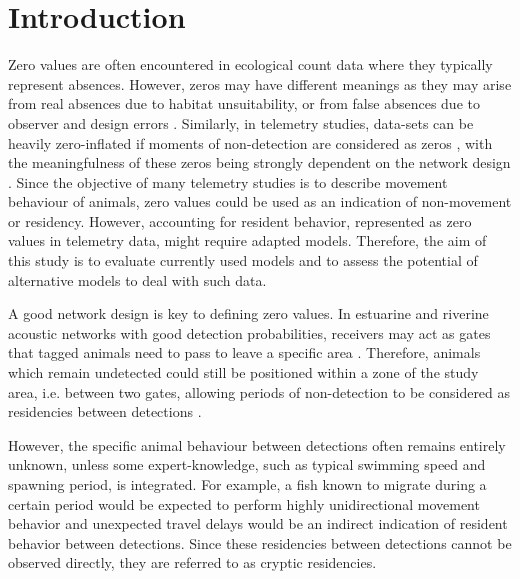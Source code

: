 \documentclass[preprint,12pt,authoryear]{elsarticle}
\begin{document}
\linenumbers

\section{Introduction}
\label{Introduction}

Zero values are often encountered in ecological count data where they typically represent absences. However, zeros may have different meanings as they may arise from real absences due to habitat unsuitability, or from false absences due to observer and design errors \citep{Blasco-Moreno2019WhatEcology}. Similarly, in telemetry studies, data-sets can be heavily zero-inflated if moments of non-detection are considered as zeros \citep{Brownscombe2019ConductingManagers,Whoriskey2019CurrentDetections}, with the meaningfulness of these zeros being strongly dependent on the network design \citep{Bruneel2020QuantifyingSystems}.
Since the objective of many telemetry studies is to describe movement behaviour of animals, zero values could be used as an indication of non-movement or residency. However, accounting for resident behavior, represented as zero values in telemetry data, might require adapted models. Therefore, the aim of this study is to evaluate currently used models and to assess the potential of alternative models to deal with such data. 

A good network design is key to defining zero values. In estuarine and riverine acoustic networks with good detection probabilities, receivers may act as gates that tagged animals need to pass to leave a specific area \citep{Kraus2018,Steckenreuter2017}. Therefore, animals which remain undetected could still be positioned within a zone of the study area, i.e. between two gates, allowing periods of non-detection to be considered as residencies between detections \citep{Bruneel2020QuantifyingSystems}. 

However, the specific animal behaviour between detections often remains entirely unknown, unless some expert-knowledge, such as typical swimming speed and spawning period, is integrated. For example, a fish known to migrate during a certain period would be expected to perform highly unidirectional movement behavior and unexpected travel delays would be an indirect indication of resident behavior between detections. Since these residencies between detections cannot be observed directly, they are referred to as cryptic residencies. 
\end{document}
